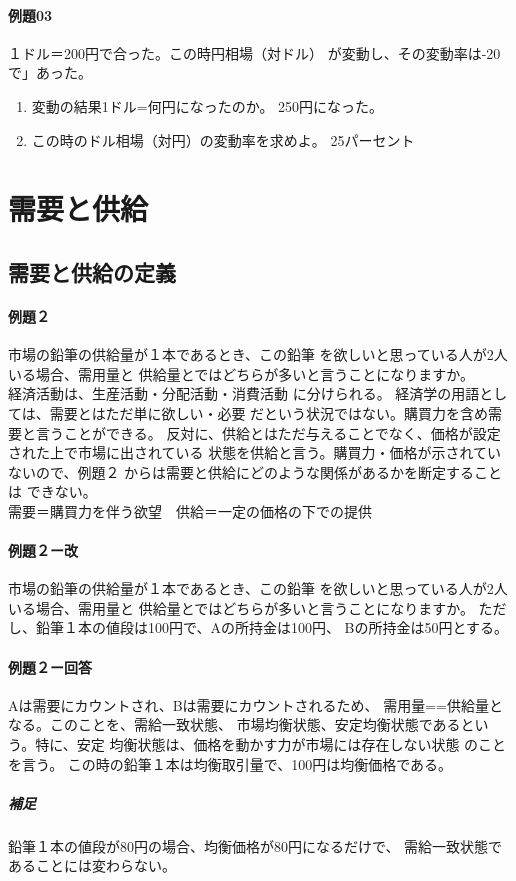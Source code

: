 \documentclass{jsarticle}
\begin{document}
\paragraph{例題03}
１ドル＝200円で合った。この時円相場（対ドル）
が変動し、その変動率は-20で」あった。
\begin{enumerate}
  \item 変動の結果1ドル=何円になったのか。
  250円になった。
  \item この時のドル相場（対円）の変動率を求めよ。
  25パーセント
\end{enumerate}

\section{需要と供給}
\subsection{需要と供給の定義}
\paragraph{例題２}
市場の鉛筆の供給量が１本であるとき、この鉛筆
を欲しいと思っている人が2人いる場合、需用量と
供給量とではどちらが多いと言うことになりますか。\\

経済活動は、生産活動・分配活動・消費活動
に分けられる。
経済学の用語としては、需要とはただ単に欲しい・必要
だという状況ではない。購買力を含め需要と言うことができる。
反対に、供給とはただ与えることでなく、価格が設定された上で市場に出されている
状態を供給と言う。購買力・価格が示されていないので、例題２
からは需要と供給にどのような関係があるかを断定することは
できない。\\
需要＝購買力を伴う欲望　供給＝一定の価格の下での提供

\paragraph{例題２ー改}
市場の鉛筆の供給量が１本であるとき、この鉛筆
を欲しいと思っている人が2人いる場合、需用量と
供給量とではどちらが多いと言うことになりますか。
ただし、鉛筆１本の値段は100円で、Aの所持金は100円、
Bの所持金は50円とする。

\paragraph{例題２ー回答}
Aは需要にカウントされ、Bは需要にカウントされるため、
需用量==供給量となる。このことを、需給一致状態、
市場均衡状態、安定均衡状態であるという。特に、安定
均衡状態は、価格を動かす力が市場には存在しない状態
のことを言う。
この時の鉛筆１本は均衡取引量で、100円は均衡価格である。
\subparagraph{補足}
鉛筆１本の値段が80円の場合、均衡価格が80円になるだけで、
需給一致状態であることには変わらない。\\
\end{document}
